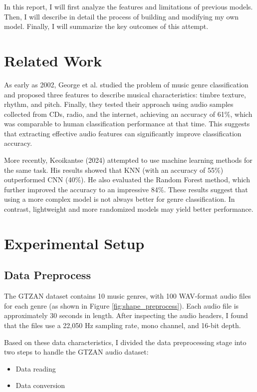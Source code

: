 \documentclass{article}
\begin{document}
    In this report, I will first analyze the features and limitations of previous models. Then, I will describe in detail the process of building and modifying my own model. Finally, I will summarize the key outcomes of this attempt.


  \section{Related Work}

    As early as 2002, George et al. studied the problem of music genre classification and proposed three features to describe musical characteristics: timbre texture, rhythm, and pitch. Finally, they tested their approach using audio samples collected from CDs, radio, and the internet, achieving an accuracy of 61\%, which was comparable to human classification performance at that time. This suggests that extracting effective audio features can significantly improve classification accuracy.

    More recently, Keoikantse (2024) attempted to use machine learning methods for the same task. His results showed that KNN (with an accuracy of 55\%) outperformed CNN (40\%). He also evaluated the Random Forest method, which further improved the accuracy to an impressive 84\%. These results suggest that using a more complex model is not always better for genre classification. In contrast, lightweight and more randomized models may yield better performance.


  \section{Experimental Setup}

    \subsection{Data Preprocess}

      The GTZAN dataset contains 10 music genres, with 100 WAV-format audio files for each genre (as shown in Figure \ref{fig:shape_preprocess}). Each audio file is approximately 30 seconds in length. After inspecting the audio headers, I found that the files use a 22,050 Hz sampling rate, mono channel, and 16-bit depth.

      Based on these data characteristics, I divided the data preprocessing stage into two steps to handle the GTZAN audio dataset: 

      \begin{itemize}
        \item Data reading
        \item Data conversion
      \end{itemize}
\end{document}
